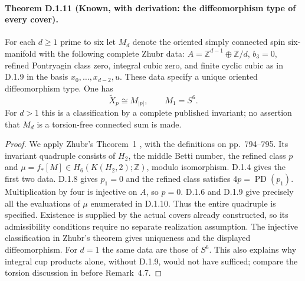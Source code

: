 \paragraph{Theorem D.1.11 (Known, with derivation: the diffeomorphism type of every cover).}
For each $d\geq1$ prime to six let $M_d$ denote the oriented
simply connected spin six-manifold with the following complete
Zhubr data: $A=\mathbb Z^{d-1}\oplus\mathbb Z/d$, $b_3=0$,
refined Pontryagin class zero, integral cubic zero, and finite
cyclic cubic as in D.1.9 in the basis
$x_0,\ldots,x_{d-2},u$. These data specify a unique oriented
diffeomorphism type. One has
\[
 \widetilde X_p\cong M_{|p|},\qquad M_1=S^6.
\]
For $d>1$ this is a classification by a complete published invariant;
no assertion that $M_d$ is a torsion-free connected sum is made.
\begin{proof}
We apply Zhubr's Theorem~1 \cite{manZhubr75}, with the definitions
on pp.~794--795. Its invariant quadruple consists of $H_2$, the
middle Betti number, the refined class $p$ and
$\mu=f_*[M]\in H_6(K(H_2,2);\mathbb Z)$, modulo isomorphism.
D.1.4 gives the first two data. D.1.8 gives $p_1=0$ and the refined
class satisfies $4p=\operatorname{PD}(p_1)$. Multiplication by four
is injective on $A$, so $p=0$. D.1.6 and D.1.9 give precisely all
the evaluations of $\mu$ enumerated in D.1.10. Thus the entire
quadruple is specified. Existence is supplied by the actual covers
already constructed, so its admissibility conditions require no
separate realization assumption. The injective classification in
Zhubr's theorem gives uniqueness and the displayed diffeomorphism.
For $d=1$ the same data are those of $S^6$. This also explains why
integral cup products alone, without D.1.9, would not have sufficed;
compare the torsion discussion in \cite{manReiser24} before Remark~4.7.
\end{proof}
